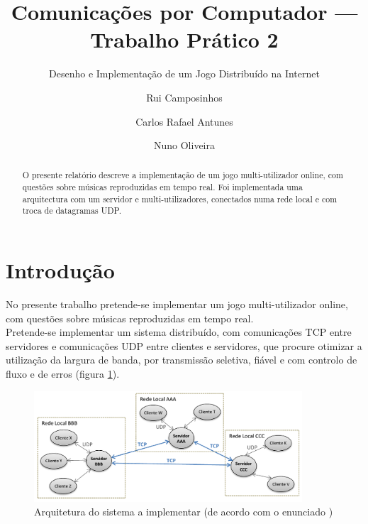 \documentclass{llncs}
\begin{document}
\mainmatter
\title{Comunicações por Computador --- Trabalho Prático 2}
\subtitle{Desenho e Implementação de um Jogo Distribuído na Internet}
\author{Rui Camposinhos \and Carlos Rafael Antunes \and Nuno Oliveira}
\date{}
\maketitle

\begin{abstract}
O presente relatório descreve a implementação de um jogo multi-utilizador online, com 
questões sobre músicas reproduzidas em tempo real. Foi implementada uma arquitectura 
com um servidor e multi-utilizadores, conectados numa rede local e com troca de datagramas UDP.

\end{abstract}

\section{Introdução}
No presente trabalho pretende-se implementar um jogo multi-utilizador online, com 
questões sobre músicas reproduzidas em tempo real.\\

Pretende-se implementar um sistema distribuído, com comunicações TCP entre servidores e 
comunicações UDP entre clientes e servidores, que procure otimizar a utilização da 
largura de banda, por transmissão seletiva, fiável e com controlo de fluxo e de erros 
(figura \ref{fig:arq}).

\begin{figure}
\begin{center}
\includegraphics[width=10cm]{arq.png} 
\end{center}
\caption{Arquitetura do sistema a implementar (de acordo com o enunciado \cite{enun})}
\label{fig:arq}
\end{figure} 
\end{document}
